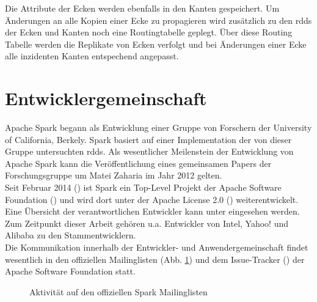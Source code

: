 Die Attribute der Ecken werden ebenfalls in den Kanten gespeichert. Um Änderungen an alle Kopien einer Ecke zu propagieren wird zusätzlich zu den \glspl{rdd} der Ecken und Kanten noch eine Routingtabelle geplegt. Über diese Routing Tabelle werden die Replikate von Ecken verfolgt und bei Änderungen einer Ecke alle inzidenten Kanten entspechend angepasst.\\

\section{Entwicklergemeinschaft}

Apache Spark begann als Entwicklung einer Gruppe von Forschern der University of California, Berkely. Spark basiert auf einer Implementation der von dieser Gruppe untersuchten \glspl{rdd}\cite{Mat12}. Als wesentlicher Meilenstein der Entwicklung von Apache Spark kann die Veröffentlichung eines gemeinsamen Papers der Forschungsgruppe um Matei Zaharia im Jahr 2012 gelten.\\

Seit Februar 2014 (\cite{apacheblog}) ist Spark ein Top-Level Projekt der Apache Software Foundation (\cite{apache}) und wird dort unter der Apache License 2.0 (\cite{apachelic}) weiterentwickelt.\\

Eine Übersicht der verantwortlichen Entwickler kann unter \cite{committer} eingesehen werden.
Zum Zeitpunkt dieser Arbeit gehören u.a. Entwickler von Intel, Yahoo! und Alibaba zu den Stammentwicklern.\\

Die Kommunikation innerhalb der Entwickler- und Anwendergemeinschaft findet wesentlich in den offiziellen Mailinglisten (Abb. \ref{fig:mailinglisten}) und dem Issue-Tracker (\cite{issuetracker}) der Apache Software Foundation statt.

\begin{figure}[ht!]
	\centering
	\caption{Aktivität auf den offiziellen Spark Mailinglisten}
	\label{fig:mailinglisten}
\end{figure}
\\

